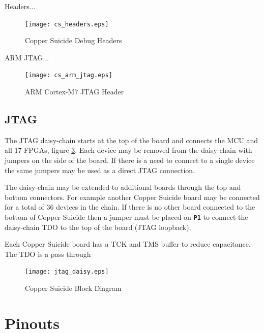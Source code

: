 \documentclass{article}
\newcommand{\designator}[1]{\textbf{\texttt{#1}}}
\begin{document}
Headers...

\begin{figure}[H]
  \centering
  \texttt{[image: cs\_headers.eps]}
  \caption{Copper Suicide Debug Headers}
  \label{fig:debugheaders}
\end{figure}

ARM JTAG...

\begin{figure}[H]
  \centering
  \texttt{[image: cs\_arm\_jtag.eps]}
  \caption{ARM Cortex-M7 JTAG Header}
  \label{fig:armjtag}
\end{figure}

\newpage

\subsection{JTAG}

The JTAG daisy-chain starts at the top of the board and connects the MCU and all 17 FPGAs, figure \ref{fig:jtagdaisy}. Each device may be removed from the daisy chain with jumpers on the side of the board. If there is a need to connect to a single device the same jumpers may be used as a direct JTAG connection.

The daisy-chain may be extended to additional boards through the top and bottom connectors. For example another Copper Suicide board may be connected for a total of 36 devices in the chain. If there is no other board connected to the bottom of Copper Suicide then a jumper must be placed on \designator{P1} to connect the daisy-chain TDO to the top of the board (JTAG loopback).

Each Copper Suicide board has a TCK and TMS buffer to reduce capacitance. The TDO is a pass through 

\begin{figure}[H]
  \centering
  \texttt{[image: jtag\_daisy.eps]}
  \caption{Copper Suicide Block Diagram}
  \label{fig:jtagdaisy}
\end{figure}

\section{Pinouts}
\end{document}
